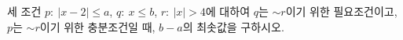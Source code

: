 세 조건 $p:\ |x-2|\le a$, $q:\ x\le b$, $r:\ |x|>4$에 대하여 $q$는 $\sim r$이기 위한 필요조건이고, $p$는 $\sim r$이기 위한 충분조건일 때, $b-a$의 최솟값을 구하시오. 
